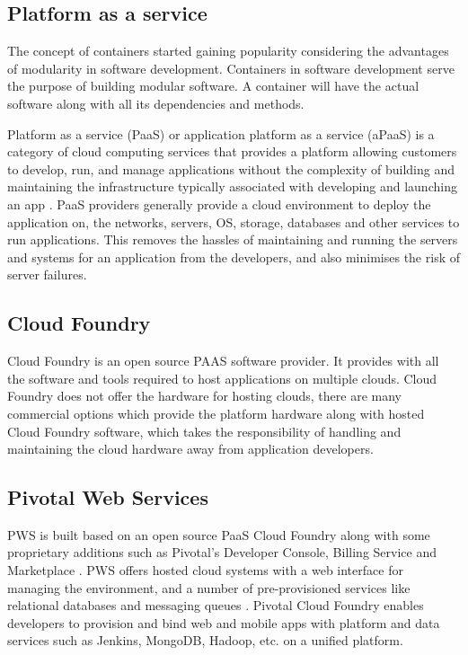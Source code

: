 \documentclass[9pt,twocolumn,twoside]{../../styles/osajnl}
\begin{document}
\subsection{Platform as a service}
The concept of containers started gaining popularity considering the advantages of modularity in software development. Containers in software development serve the purpose of building modular software. A container will have the actual software along with all its dependencies and methods. 

Platform as a service (PaaS) or application platform as a service (aPaaS) is a category of cloud computing services that provides a platform allowing customers to develop, run, and manage applications without the complexity of building and maintaining the infrastructure typically associated with developing and launching an app \cite{www-paas-wiki}. PaaS providers generally provide a cloud environment to deploy the application on, the networks, servers, OS, storage, databases and other services to run applications. This removes the hassles of maintaining and running the servers and systems for an application from the developers, and also minimises the risk of server failures. 

\subsection{Cloud Foundry}
Cloud Foundry is an open source PAAS software provider. It provides with all the software and tools required to host applications on multiple clouds. Cloud Foundry does not offer the hardware for hosting clouds, there are many commercial options which provide the platform hardware along with hosted Cloud Foundry software, which takes the responsibility of handling and maintaining the cloud hardware away from application developers.   

\subsection{Pivotal Web Services}
PWS is built based on an open source PaaS Cloud Foundry along with some proprietary additions such as Pivotal's Developer Console, Billing Service and Marketplace \cite{www-pws-register}. PWS offers hosted cloud systems with a web interface for managing the environment, and a number of pre-provisioned services like relational databases and messaging queues \cite{www-pws-stackoverflow}. Pivotal Cloud Foundry enables developers to provision and bind web and mobile apps with platform and data services such as Jenkins, MongoDB, Hadoop, etc. on a unified platform.
\end{document}
